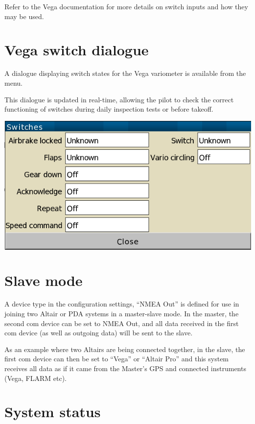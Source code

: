 Refer to the Vega documentation %
for more details on switch inputs and how they may be used.

\section{Vega switch dialogue}

A dialogue displaying switch states for the Vega variometer
is available from the menu.

This dialogue is updated in real-time, allowing the pilot
to check the correct functioning of switches during daily
inspection tests or before takeoff.

\begin{center}
\includegraphics[angle=0,width=0.7\linewidth,keepaspectratio='true']{figures/dialog-switches.png}
\end{center}

\section{Slave mode}

A device type in the configuration settings, ``NMEA Out'' is defined
for use in joining two Altair or PDA systems in a master-slave mode.
In the master, the second com device can be set to NMEA Out, and all
data received in the first com device (as well as outgoing data) will
be sent to the slave.

As an example where two Altairs are being connected together, in the
slave, the first com device can then be set to ``Vega'' or ``Altair
Pro'' and this system receives all data as if it came from the
Master's GPS and connected instruments (Vega, FLARM etc).


\section{System status}\label{sec:system-status}


